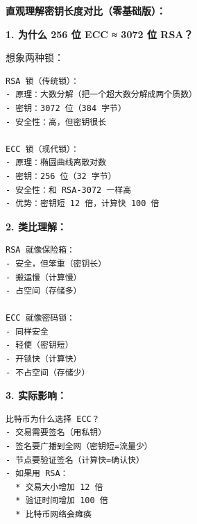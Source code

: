 \begin{theorybox}
\textbf{直观理解密钥长度对比（零基础版）：}

\textbf{1. 为什么 256 位 ECC ≈ 3072 位 RSA？}

想象两种锁：
\begin{lstlisting}
RSA 锁（传统锁）：
- 原理：大数分解（把一个超大数分解成两个质数）
- 密钥：3072 位（384 字节）
- 安全性：高，但密钥很长

ECC 锁（现代锁）：
- 原理：椭圆曲线离散对数
- 密钥：256 位（32 字节）
- 安全性：和 RSA-3072 一样高
- 优势：密钥短 12 倍，计算快 100 倍
\end{lstlisting}

\textbf{2. 类比理解：}

\begin{lstlisting}
RSA 就像保险箱：
- 安全，但笨重（密钥长）
- 搬运慢（计算慢）
- 占空间（存储多）

ECC 就像密码锁：
- 同样安全
- 轻便（密钥短）
- 开锁快（计算快）
- 不占空间（存储少）
\end{lstlisting}

\textbf{3. 实际影响：}

\begin{lstlisting}
比特币为什么选择 ECC？
- 交易需要签名（用私钥）
- 签名要广播到全网（密钥短=流量少）
- 节点要验证签名（计算快=确认快）
- 如果用 RSA：
  * 交易大小增加 12 倍
  * 验证时间增加 100 倍
  * 比特币网络会瘫痪
\end{lstlisting}
\end{theorybox}

